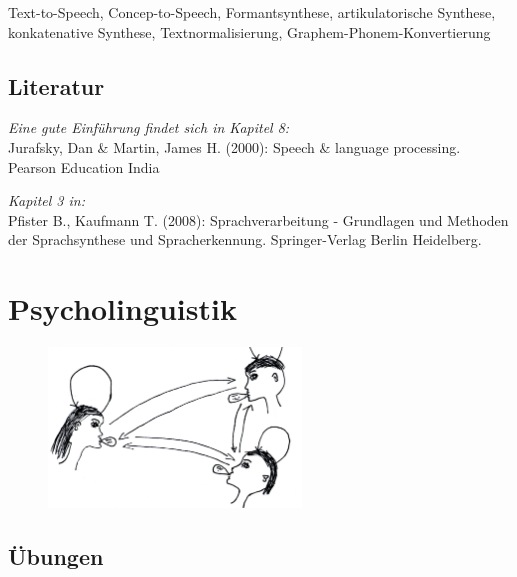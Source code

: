\documentclass[11pt]{book}
\begin{document}
Text-to-Speech, Concep-to-Speech, Formantsynthese, artikulatorische Synthese, konkatenative Synthese, Textnormalisierung, Graphem-Phonem-Konvertierung



\section{Literatur}


\emph{Eine gute Einführung findet sich in Kapitel 8:}\\
Jurafsky, Dan \& Martin, James H. (2000): Speech \& language processing. Pearson Education India

\emph{Kapitel 3 in:}\\
Pfister B., Kaufmann T. (2008): Sprachverarbeitung - Grundlagen und 
	Methoden der Sprachsynthese und Spracherkennung. 
	Springer-Verlag Berlin Heidelberg.


\renewcommand\refname{\vskip -1cm}
{}










\chapter{Psycholinguistik}
\begin{figure}[htbp]
\begin{center}
\includegraphics[width=0.6\textwidth]{grafiken/psycholinguistik/psycholinguistik}
\label{t9}
\end{center}
\end{figure}


\section{Übungen}
\end{document}
